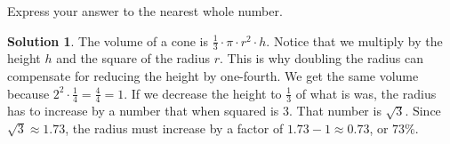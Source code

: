 \documentclass{article}
\theoremstyle{definition}
\newtheorem*{solution}{Solution}
\begin{document}
\begin{multicols}{2}
\begin{enumerate}
        Express your answer to the nearest whole number.
        \begin{solution}
            The volume of a cone is $\frac{1}{3} \cdot \pi \cdot r^2 \cdot h$.
            Notice that we multiply by the height $h$ and the square of the radius $r$.
            This is why doubling the radius can compensate for reducing the height by one-fourth.
            We get the same volume because $2^2 \cdot \frac{1}{4} = \frac{4}{4} = 1$.
            If we decrease the height to $\frac{1}{3}$ of what is was, the radius has to increase by a number that when squared is $3$.
            That number is $\sqrt{3}$.
            Since $\sqrt{3} \approx 1.73$, the radius must increase by a factor of $1.73 - 1 \approx 0.73$, or $73\%$.
        \end{solution}
    \end{enumerate}
\end{multicols}
\end{document}
